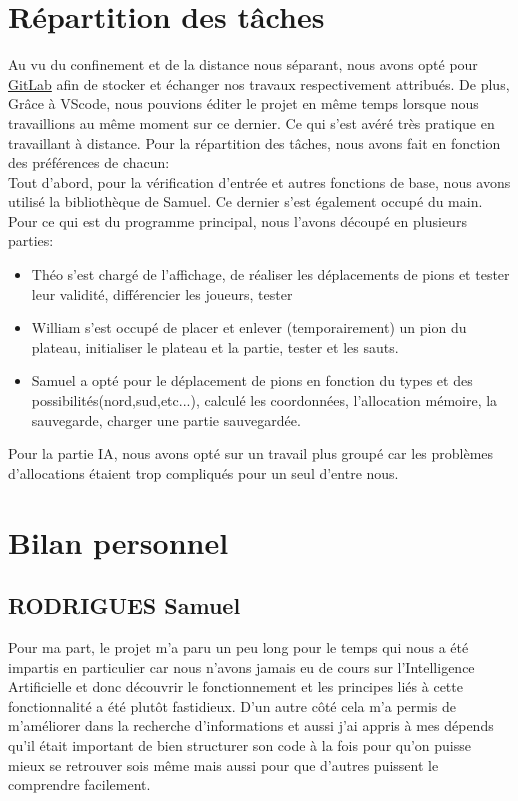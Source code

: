 \documentclass{article}
\begin{document}
\section{Répartition des tâches}
    Au vu du confinement et de la distance nous séparant, nous avons opté pour \href{https://gitlab.etude.eisti.fr/rodriguess/jeu-de-traverse}{GitLab} afin de stocker et échanger nos travaux respectivement attribués. De plus, Grâce à VScode, nous pouvions éditer le projet en même temps lorsque nous travaillions au même moment sur ce dernier. Ce qui s'est avéré très pratique en travaillant à distance. Pour la répartition des tâches, nous avons fait en fonction des préférences de chacun: \\
    Tout d'abord, pour la vérification d'entrée et autres fonctions de base, nous avons utilisé la bibliothèque de Samuel. Ce dernier s'est également occupé du main. Pour ce qui est du programme principal, nous l'avons découpé en plusieurs parties:
\begin{itemize}
    \item Théo s'est chargé de l'affichage, de réaliser les déplacements de pions et tester leur validité, différencier les joueurs, tester
    \item William s'est occupé de placer et enlever (temporairement) un pion du plateau, initialiser le plateau et la partie, tester et les sauts.
    \item Samuel a opté pour le déplacement de pions en fonction du types et des possibilités(nord,sud,etc...), calculé les coordonnées, l'allocation mémoire, la sauvegarde, charger une partie sauvegardée.
\end{itemize}
Pour la partie IA, nous avons opté sur un travail plus groupé car les problèmes d'allocations étaient trop compliqués pour un seul d'entre nous.

\section{Bilan personnel}
    \subsection{RODRIGUES Samuel}
    
    Pour ma part, le projet m'a paru un peu long pour le temps qui nous a été impartis en particulier car nous n'avons jamais eu de cours sur l'Intelligence Artificielle et donc découvrir le fonctionnement et les principes liés à cette fonctionnalité a été plutôt fastidieux. D'un autre côté cela m'a permis de m'améliorer dans la recherche d'informations et aussi j'ai appris à mes dépends qu'il était important de bien structurer son code à la fois pour qu'on puisse mieux se retrouver sois même mais aussi pour que d'autres puissent le comprendre facilement.
    
\end{document}
